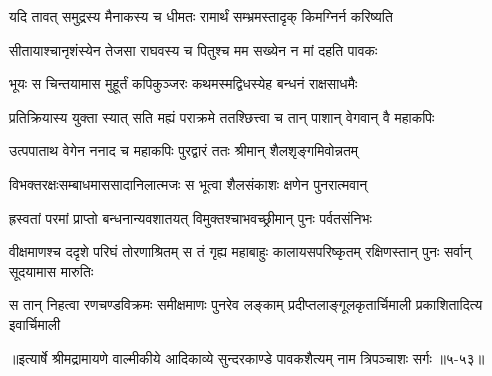 \twolineshloka
{यदि तावत् समुद्रस्य मैनाकस्य च धीमतः}
{रामार्थं सम्भ्रमस्तादृक् किमग्निर्न करिष्यति} %

\twolineshloka
{सीतायाश्चानृशंस्येन तेजसा राघवस्य च}
{पितुश्च मम सख्येन न मां दहति पावकः} %

\twolineshloka
{भूयः स चिन्तयामास मुहूर्तं कपिकुञ्जरः}
{कथमस्मद्विधस्येह बन्धनं राक्षसाधमैः} %

\twolineshloka
{प्रतिक्रियास्य युक्ता स्यात् सति मह्यं पराक्रमे}
{ततश्छित्त्वा च तान् पाशान् वेगवान् वै महाकपिः} %

\twolineshloka
{उत्पपाताथ वेगेन ननाद च महाकपिः}
{पुरद्वारं ततः श्रीमान् शैलशृङ्गमिवोन्नतम्} %

\twolineshloka
{विभक्तरक्षःसम्बाधमाससादानिलात्मजः}
{स भूत्वा शैलसंकाशः क्षणेन पुनरात्मवान्} %

\twolineshloka
{ह्रस्वतां परमां प्राप्तो बन्धनान्यवशातयत्}
{विमुक्तश्चाभवच्छ्रीमान् पुनः पर्वतसंनिभः} %

\threelineshloka
{वीक्षमाणश्च ददृशे परिघं तोरणाश्रितम्}
{स तं गृह्य महाबाहुः कालायसपरिष्कृतम्}
{रक्षिणस्तान् पुनः सर्वान् सूदयामास मारुतिः} %

\twolineshloka
{स तान् निहत्वा रणचण्डविक्रमः समीक्षमाणः पुनरेव लङ्काम्}
{प्रदीप्तलाङ्गूलकृतार्चिमाली प्रकाशितादित्य इवार्चिमाली} %


॥इत्यार्षे श्रीमद्रामायणे वाल्मीकीये आदिकाव्ये सुन्दरकाण्डे पावकशैत्यम् नाम त्रिपञ्चाशः सर्गः ॥५-५३॥

